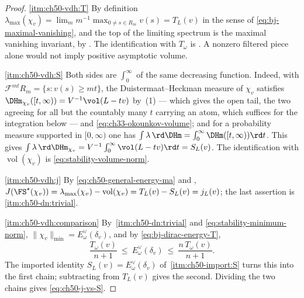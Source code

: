 \begin{proof}
\cref{itm:ch50-vdh:T}  By definition $\lambda_{\max}(\chi_v)
=\lim_m m^{-1}\max_{0\ne s\in R_m}v(s)=T_L(v)$ in the sense of
\eqref{eq:bj-maximal-vanishing}, and
the top of the limiting spectrum is the maximal vanishing invariant,
by .  The identification with $T_\omega$
is .  A nonzero filtered piece alone would
not imply positive asymptotic volume.

\cref{itm:ch50-vdh:S}  Both sides are $\int_0^\infty$ of the same
decreasing function.  Indeed, with $\mathcal F^{mt}R_m
=\{s:v(s)\ge mt\}$, the Duistermaat--Heckman measure of $\chi_v$
satisfies $\DHm_{\chi_v}([t,\infty))=V^{-1}\vol(L-tv)$ by
\,(1) --- which gives the open tail, the two
agreeing for all but the countably many $t$ carrying an atom, which
suffices for the integration below --- and \eqref{eq:ch33-okounkov-volume}; and
for a probability measure supported in $[0,\infty)$ one has
$\int\lambda\,\rd\DHm=\int_0^\infty\DHm([t,\infty))\rd t$.  This gives
$\int\lambda\,\rd\DHm_{\chi_v}=V^{-1}\int_0^\infty\vol(L-tv)\rd t
=S_L(v)$.  The identification with $\operatorname{vol}(\chi_v)$ is
\eqref{eq:stability-volume-norm}.

\cref{itm:ch50-vdh:j}  By \eqref{eq:ch50-general-energy-ma} and
,
$J(\FS^\star(\chi_v))=\lambda_{\max}(\chi_v)-\operatorname{vol}(\chi_v)
=T_L(v)-S_L(v)=j_L(v)$; the last assertion is
\,\cref{itm:ch50-dn:trivial}.

\cref{itm:ch50-vdh:comparison}  By
\,\cref{itm:ch50-dn:trivial} and
\eqref{eq:stability-minimum-norm}, $\|\chi_v\|_{\min}
=E^\vee_\omega(\delta_v)$, and by \eqref{eq:bj-dirac-energy-T},
\[
 \frac{T_\omega(v)}{n+1}\ \le\ E^\vee_\omega(\delta_v)
 \ \le\ \frac{n\,T_\omega(v)}{n+1}.
\]
The imported identity $S_L(v)=E^\vee_\omega(\delta_v)$ of
\,\cref{itm:ch50-import:S} turns this into the
first chain; subtracting from $T_L(v)$ gives the second.  Dividing the
two chains gives \eqref{eq:ch50-j-vs-S}.
\end{proof}

